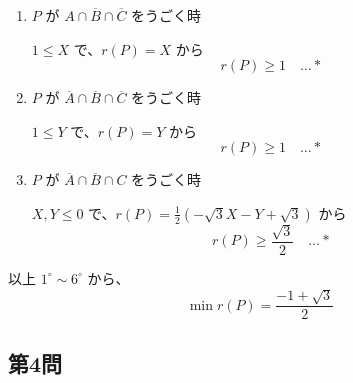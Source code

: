 \documentclass[../main.tex]{subfiles}
\begin{document}
\begin{enumerate}
    $B$ に含まれる $\dots r \le Y$, $C$ に含まれる $\dots r \le \frac{1}{2}(-\sqrt{3}X - Y + \sqrt{3})$ で、$0 \le Y \le \sqrt{3}(-X+1) \quad (X \le 0)$ である。よって、
    \[
      \begin{cases}
        0 \le Y \le \frac{\sqrt{3}}{3}(-X+1) \text{ の時 } r(P) = \frac{1}{2}(-\sqrt{3}X - Y + \sqrt{3}) \\
        \frac{\sqrt{3}}{3}(-X+1) \le Y \le \sqrt{3}(-X+1) \text{ の時 } r(P) = Y
      \end{cases}
    \]
    左図から、
    \[
      r(P) \ge \frac{\sqrt{3}}{3} \quad \dots *
    \]

  \item[$4^\circ$] $P$ が $A \cap \overline{B} \cap \overline{C}$ をうごく時

    $1 \le X$ で、$r(P) = X$ から
    \[
      r(P) \ge 1 \quad \dots *
    \]

  \item[$5^\circ$] $P$ が $\overline{A} \cap \overline{B} \cap \overline{C}$ をうごく時

    $1 \le Y$ で、$r(P) = Y$ から
    \[
      r(P) \ge 1 \quad \dots *
    \]

  \item[$6^\circ$] $P$ が $\overline{A} \cap \overline{B} \cap C$ をうごく時

    $X, Y \le 0$ で、$r(P) = \frac{1}{2}(-\sqrt{3}X - Y + \sqrt{3})$ から
    \[
      r(P) \ge \frac{\sqrt{3}}{2} \quad \dots *
    \]
\end{enumerate}

以上 $1^\circ \sim 6^\circ$ から、
\[
  \min r(P) = \frac{-1 + \sqrt{3}}{2}
\]

\newpage

\subsection*{第4問}
\end{document}
